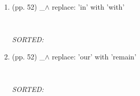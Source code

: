 \documentclass[12pt]{article}
\begin{document}
\begin{enumerate}
\item  (pp. 52)  \_$\wedge$  
	replace: 'in' with 'with'
	\begin{verbatim}
	
	\end{verbatim}
	\textit{
	SORTED:  
	}
	\\

\item  (pp. 52)  \_$\wedge$  
	replace: 'our' with 'remain'
	\begin{verbatim}
	
	\end{verbatim}
	\textit{
	SORTED:  
	}
	\\



\end{enumerate}
\end{document}
